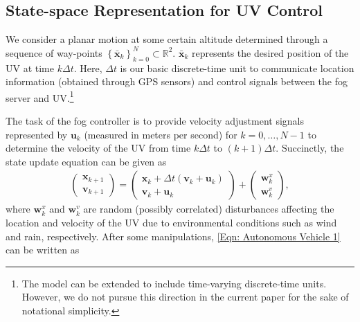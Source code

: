 \documentclass[10pt, journal, letterpaper]{IEEEtran}
\newcommand{\paren}[1]{\left(#1\right)}
\newcommand{\brparen}[1]{\left\{#1\right\}}
\newcommand{\field}[1]{\ensuremath{\mathbb{#1}}}
\newcommand{\R}{\ensuremath{\field{R}}} %
\newcommand{\1}{\ensuremath{\mathbf{1}}} %
\newcommand{\vecbold}[1]{\ensuremath{\boldsymbol{#1}}}
\begin{document}
\subsection{State-space Representation for UV Control}

We consider a planar motion at some certain altitude determined through a sequence of way-points $\brparen{\bar{\vecbold{x}}_k}_{k=0}^N \subset \R^2$. $\bar{\vecbold{x}}_k$ represents the desired position of the UV at time $k \Delta t$. Here, $\Delta t$ is our basic discrete-time unit to communicate location information (obtained through GPS sensors) and control signals between the fog server and UV.\footnote{The model can be extended to include time-varying discrete-time units. However, we do not pursue this direction in the current paper for the sake of notational simplicity.}

The task of the fog controller is to provide velocity adjustment signals represented by $\vecbold{u}_k$ (measured in meters per second) for $k=0, \ldots, N-1$ to determine the velocity of the UV from time $k \Delta t$ to $\paren{k+1} \Delta t$. Succinctly, the state update equation can be given as
\begin{eqnarray}
\left(\begin{array}{c} \vecbold{x}_{k+1} \\ \vecbold{v}_{k+1} \end{array}\right) = \left(\begin{array}{c}\vecbold{x}_{k} + \Delta t \paren{\vecbold{v}_k + \vecbold{u}_k} \\ \vecbold{v}_{k} + \vecbold{u}_k \end{array}\right) + \left(\begin{array}{c}\vecbold{w}_{k}^x \\ \vecbold{w}_k^v\end{array}\right), \label{Eqn: Autonomous Vehicle 1}
\end{eqnarray}
where $\vecbold{w}_{k}^x$ and $\vecbold{w}_k^v$ are random (possibly correlated) disturbances affecting the location and velocity of the UV due to environmental conditions such as wind and rain, respectively. After some manipulations, \eqref{Eqn: Autonomous Vehicle 1} can be written as %
\end{document}

